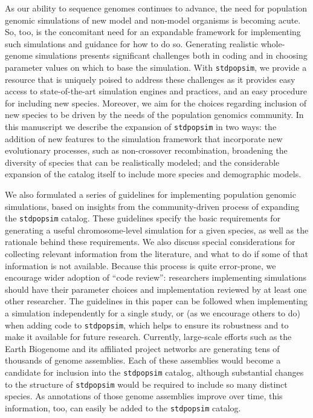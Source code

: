 \documentclass[hidelinks]{article}
\newcommand{\stdpopsim}{\texttt{stdpopsim}\xspace}
\begin{document}
As our ability to sequence genomes continues to advance, the need for
population genomic simulations of new model and non-model organisms is becoming acute.
So, too, is the concomitant need for an expandable framework for implementing such simulations and guidance for how to do so.
Generating realistic whole-genome simulations presents significant challenges
both in coding and in choosing parameter values on which to base the simulation.
With \stdpopsim, we provide a resource that is uniquely poised to address these 
challenges as it provides easy access to state-of-the-art simulation engines and practices, and an easy procedure for including new species.
Moreover, we aim for the choices regarding inclusion of new species to be driven
by the needs of the population genomics community.
In this manuscript we 
describe the expansion of \stdpopsim in two ways:
the addition of new features to the simulation framework that incorporate new evolutionary processes,
such as non-crossover recombination, broadening the diversity of species that can
be realistically modeled; and the considerable expansion of the catalog itself
to include more species and demographic models. 

We also formulated a series of guidelines for implementing
population genomic simulations, based on
insights from the community-driven process of expanding the \stdpopsim catalog.
These guidelines specify the basic requirements for generating a useful chromosome-level simulation for a given species, as well as the rationale behind these requirements.
We also discuss special considerations for collecting relevant information from the literature,
and what to do if some of that information is not available.
Because this process is quite error-prone,
we encourage wider adoption of ``code review'':
researchers implementing simulations should have their
parameter choices and implementation reviewed by at least one other researcher.
The guidelines in this paper can be followed when implementing a simulation independently for a single study,
or (as we encourage others to do) when adding code to \stdpopsim,
which helps to ensure its robustness and to make it available for future research.
Currently, large-scale efforts such as the Earth Biogenome
and its affiliated project networks are generating tens of thousands of genome
assemblies. Each of these assemblies
would become a candidate for inclusion into the
\stdpopsim catalog, %
although substantial changes to the structure of \stdpopsim would be required
to include so many distinct species.
As annotations of those genome assemblies improve over time, this information, too, can easily be added to the \stdpopsim catalog.
\end{document}
